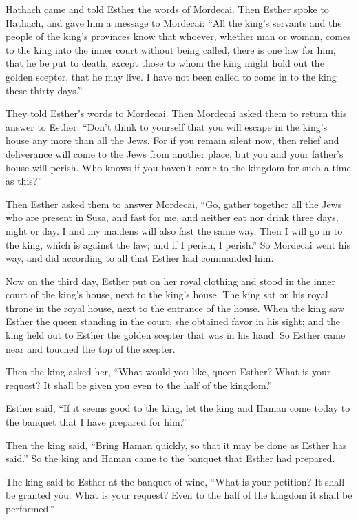 \myverse{}Hathach came and told Esther the words of Mordecai.
\myverse{}Then Esther spoke to Hathach, and gave him a message to Mordecai:
\myverse{}“All the king’s servants and the people of the king’s provinces know that
whoever, whether man or woman, comes to the king into the inner court without being called, there is one
law for him, that he be put to death, except those to whom the king might hold out the golden scepter,
that he may live. I have not been called to come in to the king these thirty days.”

\myverse{}They told Esther’s words to Mordecai.
\myverse{}Then Mordecai asked them to return this answer to Esther: “Don’t think to
yourself that you will escape in the king’s house any more than all the Jews.
\myverse{}For if you remain silent now, then relief and deliverance will come to the
Jews from another place, but you and your father’s house will perish. Who knows if you haven’t come to
the kingdom for such a time as this?”

\myverse{}Then Esther asked them to answer Mordecai,
\myverse{}“Go, gather together all the Jews who are present in Susa, and fast for me,
and neither eat nor drink three days, night or day. I and my maidens will also fast the same way. Then
I will go in to the king, which is against the law; and if I perish, I perish.”
\myverse{}So Mordecai went his way, and did according to all that Esther had commanded
him.


\mychapter{}\myverse*{}Now on the third day, Esther put on her royal clothing and stood
in the inner court of the king’s house, next to the king’s house. The king sat on his royal throne in
the royal house, next to the entrance of the house.
\myverse{}When the king saw Esther the queen standing in the court, she obtained favor
in his sight; and the king held out to Esther the golden scepter that was in his hand. So Esther came
near and touched the top of the scepter.

\myverse{}Then the king asked her, “What would you like, queen Esther? What
is your request? It shall be given you even to the half of the kingdom.”

\myverse{}Esther said, “If it seems good to the king, let the king and Haman
come today to the banquet that I have prepared for him.”

\myverse{}Then the king said, “Bring Haman quickly, so that it may be done
as Esther has said.” So the king and Haman came to the banquet that Esther had prepared.

\myverse{}The king said to Esther at the banquet of wine, “What is your petition?
It shall be granted you. What is your request? Even to the half of the kingdom it shall be performed.”

